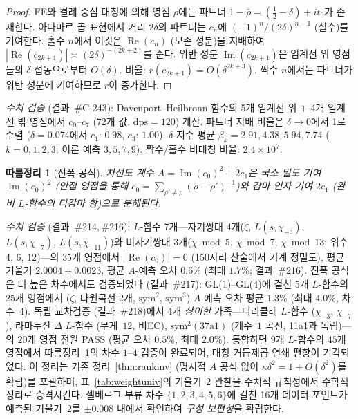 \documentclass[11pt, a4paper]{article}
\theoremstyle{plain}
\newtheorem{corollary}[theorem]{따름정리}
\theoremstyle{definition}
\begin{document}
\begin{proof}
FE와 켤레 중심 대칭에 의해 영점 $\rho$에는 파트너 $1{-}\bar{\rho}=(\tfrac{1}{2}-\delta)+it_0$가
존재한다. 아다마르 곱 표현에서 거리 $2\delta$의 파트너는
$c_n$에 $(-1)^n/(2\delta)^{n+1}$ (실수)를 기여한다.
홀수 $n$에서 이것은 $\operatorname{Re}(c_n)$ (보존 성분)을 지배하여
$|\!\operatorname{Re}(c_{2k+1})|\asymp (2\delta)^{-(2k+2)}$를 준다.
위반 성분 $\operatorname{Im}(c_{2k+1})$은 임계선 위 영점들의
$\delta$-섭동으로부터 $O(\delta)$.
비율: $r(c_{2k+1})=O(\delta^{2k+3})$.
짝수 $n$에서는 파트너가 위반 성분에 기여하므로 $r$이 증가한다.
\end{proof}

\noindent\textit{수치 검증} (결과~\#C-243):
Davenport--Heilbronn 함수의 5개 임계선 위 + 4개 임계선 밖 영점에서
$c_0$--$c_7$ (72개 값, $\mathrm{dps}=120$) 계산.
파트너 지배 비율은 $\delta\to 0$에서 1로 수렴
($\delta=0.074$에서 $c_1$: $0.98$, $c_3$: $1.00$).
$\delta$-지수 평균 $\beta_k=2.91, 4.38, 5.94, 7.74$ ($k=0,1,2,3$;
이론 예측 $3,5,7,9$).
짝수/홀수 비대칭 비율: $2.4\times 10^7$.

\begin{corollary}[진폭 공식]
\label{cor:amplitude}
  차선도 계수 $A=\operatorname{Im}(c_0)^2+2c_1$은
  \emph{국소 밀도} 기여 $\operatorname{Im}(c_0)^2$
  (인접 영점을 통해 $c_0=\sum_{\rho'\neq\rho}(\rho-\rho')^{-1}$)와
  \emph{감마 인자} 기여 $2c_1$ (완비 $L$-함수의 디감마 항)으로 분해된다.
\end{corollary}

\noindent\textit{수치 검증} (결과~\#214,\,\#216):
$L$-함수 7개---자기쌍대 4개($\zeta$, $L(s,\chi_{-3})$, $L(s,\chi_{-7})$,
$L(s,\chi_{-11})$)와 비자기쌍대 3개($\chi\bmod 5$, $\chi\bmod 7$,
$\chi\bmod 13$; 위수 $4$, $6$, $12$)---의 $35$개 영점에서
$|\operatorname{Re}(c_0)|=0$ (150자리 산술에서 기계 정밀도),
평균 기울기 $2.0004\pm 0.0023$, 평균 $A$-예측 오차 $0.6\%$ (최대 $1.7\%$;
결과~\#216).
진폭 공식은 더 높은 차수에서도 검증되었다 (결과~\#217):
GL(1)--GL(4)에 걸친 5개 $L$-함수의 $25$개 영점에서
($\zeta$, 타원곡선 2개, $\mathrm{sym}^{2}$, $\mathrm{sym}^{3}$)
$A$-예측 오차 평균 $1.3\%$ (최대 $4.0\%$, 차수~$4$).
독립 교차검증 (결과~\#218)에서 4개 \emph{상이한} 가족---디리클레 $L$-함수
($\chi_{-3}$, $\chi_{-7}$), 라마누잔 $\Delta$ $L$-함수 (무게~$12$, 비EC),
$\mathrm{sym}^{2}(\text{37a1})$ (계수~$1$ 곡선, 11a1과 독립)---의 $20$개
영점 전원 PASS (평균 오차 $0.5\%$, 최대 $2.0\%$).
통합하면 9개 $L$-함수의 $45$개 영점에서
따름정리~\ref{cor:amplitude}의 차수 $1$--$4$ 검증이 완료되어,
대칭 거듭제곱 연쇄 편향이 기각되었다.
이 정리는 기존 정리~\ref{thm:rankinv} (명시적 $A$ 공식 없이
$\kappa\delta^2=1+O(\delta^2)$를 확립)를 포괄하며,
표~\ref{tab:weightuniv}의 기울기~$2$ 관찰을 수치적 규칙성에서
수학적 정리로 승격시킨다.
셀베르그 부류 차수 $\{1,2,3,4,5,6\}$에 걸친 16개 데이터 포인트가
예측된 기울기~$2$를 $\pm 0.008$ 내에서 확인하여
\emph{구성 보편성}을 확립한다.
\end{document}
